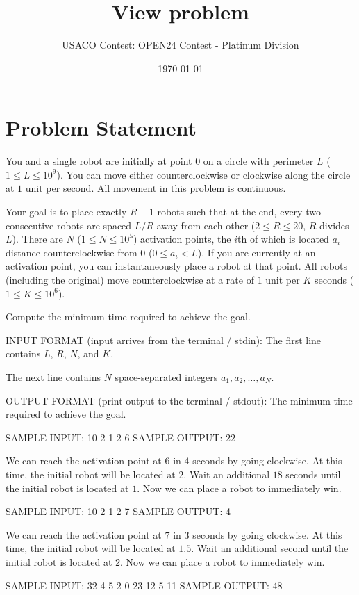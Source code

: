\documentclass[12pt]{article}
\title{View problem}
\author{USACO Contest: OPEN24 Contest - Platinum Division}
\date{\today}
\begin{document}
\maketitle

\section*{Problem Statement}


You and a single robot are initially at point $0$ on a circle with perimeter $L$
($1 \le L \le 10^9$). You can move either counterclockwise or clockwise along
the circle at $1$ unit per second. All movement in this problem is continuous.

Your goal is to place exactly $R-1$ robots such that at the end, every two
consecutive robots are spaced $L/R$ away from each other ($2\le R\le 20$, $R$
divides $L$). There are $N$ ($1\le N\le 10^5$) activation points, the $i$th of
which is located $a_i$ distance counterclockwise from $0$ ($0\le a_i<L$). If you are
currently at an activation point, you can instantaneously place a robot at that
point. All robots (including the original) move counterclockwise at a rate of
$1$ unit per $K$ seconds ($1\leq K\leq 10^6$).

Compute the minimum time required to achieve the goal.

INPUT FORMAT (input arrives from the terminal / stdin):
The first line contains $L$, $R$, $N$, and $K$.

The next line contains $N$ space-separated integers $a_1,a_2,\dots,a_N$.

OUTPUT FORMAT (print output to the terminal / stdout):
The minimum time required to achieve the goal.

SAMPLE INPUT:
10 2 1 2
6
SAMPLE OUTPUT: 
22

We can reach the activation point at $6$ in $4$ seconds by going clockwise. At
this time, the initial robot will be located at $2$. Wait an additional $18$
seconds until the initial robot is located at $1$. Now we can place a robot to
immediately win.

SAMPLE INPUT:
10 2 1 2
7
SAMPLE OUTPUT: 
4

We can reach the activation point at $7$ in $3$ seconds by going clockwise. At
this time, the initial robot will be located at $1.5$. Wait an additional second
until the initial robot is located at $2$. Now we can place a robot to
immediately win.

SAMPLE INPUT:
32 4 5 2
0 23 12 5 11
SAMPLE OUTPUT: 
48
\end{document}

